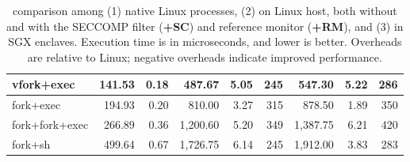 \begin{table}[t!b!]
\begin{tabular}{|l|rr|rrr|rrr|}
vfork+exec     & 141.53 & 0.18 &   487.67 & 5.05 & 245 &   547.30 & 5.22 &   286   \\\hline
fork+exec      & 194.93 & 0.20 &   810.00 & 3.27 & 315 &   878.50 & 1.89 &   350   \\\hline
fork+fork+exec & 266.89 & 0.36 & 1,200.60 & 5.20 & 349 & 1,387.75 & 6.21 &   420   \\\hline
fork+sh        & 499.64 & 0.67 & 1,726.75 & 6.14 & 245 & 1,912.00 & 3.83 &   283   \\\hline
\end{tabular}
\caption[\lmbench{} benchmarking results in Linux, KVM and \graphene{}]
{\lmbench{} comparison among (1) native Linux processes, (2) \graphene{} \picoprocs{} on Linux host, both without and with the SECCOMP filter ({\bf +SC}) and reference monitor ({\bf +RM}), and (3) \graphene{} in SGX enclaves.
Execution time is in microseconds, and lower is better. 
Overheads are relative to Linux; negative overheads indicate improved performance.} 
\label{tab:graphene:lmbench}
\end{table}


